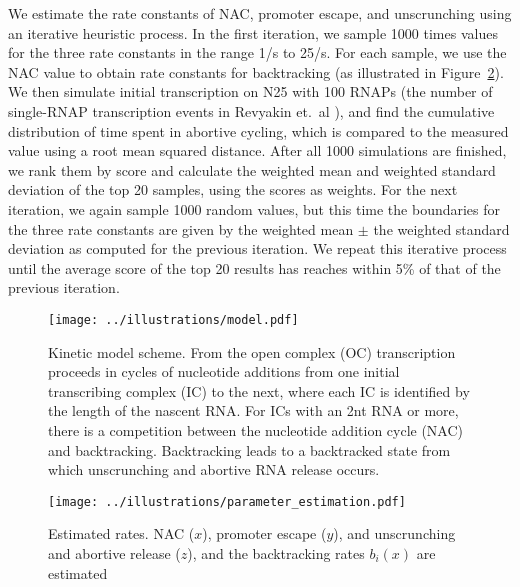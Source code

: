 We estimate the rate constants of NAC, promoter escape, and unscrunching using an
iterative heuristic process. In the first iteration, we sample 1000 times
values for the three rate constants in the range 1/s to 25/s. For each sample,
we use the NAC value to obtain rate constants for backtracking (as illustrated
in Figure~\ref{fig:parameter_estimation}). We then simulate initial
transcription on N25 with 100 RNAPs (the number of single-RNAP transcription
events in Revyakin et.\ al \cite{revyakin_abortive_2006}), and find the
cumulative distribution of time spent in abortive cycling, which is compared
to the measured value using a root mean squared distance. After all 1000
simulations are finished, we rank them by score and calculate the weighted
mean and weighted standard deviation of the top 20 samples, using the scores
as weights. For the next iteration, we again sample 1000 random values, but
this time the boundaries for the three rate constants are given by the
weighted mean $\pm$ the weighted standard deviation as computed for the
previous iteration. We repeat this iterative process until the average score
of the top 20 results has reaches within 5\% of that of the previous iteration.

\begin{figure}
	\begin{center}
        \texttt{[image: ../illustrations/model.pdf]}
	\end{center}
    \caption{Kinetic model scheme. From the open complex (OC)
    transcription proceeds in cycles of nucleotide additions from one initial
    transcribing complex (IC) to the next, where each IC is identified by the
    length of the nascent RNA. For ICs with an 2nt RNA or more, there is a
    competition between the nucleotide addition cycle (NAC) and backtracking.
    Backtracking leads to a backtracked state from which unscrunching and
    abortive RNA release occurs.}
    \label{fig:model}
\end{figure}

\begin{figure}
	\begin{center}
        \texttt{[image: ../illustrations/parameter\_estimation.pdf]}
	\end{center}
    \caption{Estimated rates. NAC ($x$), promoter escape ($y$), and
    unscrunching and abortive release ($z$), and the backtracking rates
    $b_i(x)$ are estimated}
    \label{fig:parameter_estimation}
\end{figure}
%
